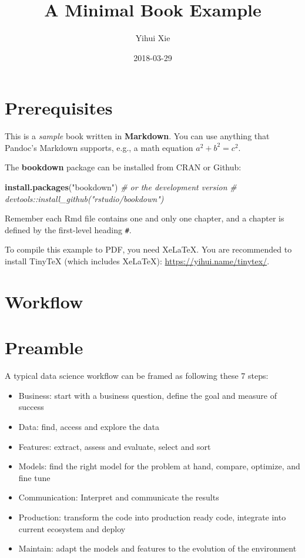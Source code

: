 \documentclass[]{book}
\title{A Minimal Book Example}
\author{Yihui Xie}
\date{2018-03-29}
\newenvironment{Shaded}{\begin{snugshade}}{\end{snugshade}}
\newcommand{\KeywordTok}[1]{\textcolor[rgb]{0.13,0.29,0.53}{\textbf{#1}}}
\newcommand{\StringTok}[1]{\textcolor[rgb]{0.31,0.60,0.02}{#1}}
\newcommand{\CommentTok}[1]{\textcolor[rgb]{0.56,0.35,0.01}{\textit{#1}}}
\newcommand{\NormalTok}[1]{#1}
\theoremstyle{definition}
\theoremstyle{definition}
\theoremstyle{definition}
\theoremstyle{remark}
\begin{document}
\maketitle

{
\setcounter{tocdepth}{1}
\tableofcontents
}
\chapter{Prerequisites}\label{prerequisites}

This is a \emph{sample} book written in \textbf{Markdown}. You can use
anything that Pandoc's Markdown supports, e.g., a math equation
\(a^2 + b^2 = c^2\).

The \textbf{bookdown} package can be installed from CRAN or Github:

\begin{Shaded}
\begin{Highlighting}[]
\KeywordTok{install.packages}\NormalTok{(}\StringTok{"bookdown"}\NormalTok{)}
\CommentTok{# or the development version}
\CommentTok{# devtools::install_github("rstudio/bookdown")}
\end{Highlighting}
\end{Shaded}

Remember each Rmd file contains one and only one chapter, and a chapter
is defined by the first-level heading \texttt{\#}.

To compile this example to PDF, you need XeLaTeX. You are recommended to
install TinyTeX (which includes XeLaTeX):
\url{https://yihui.name/tinytex/}.

\chapter{Workflow}\label{workflow}

\chapter{Preamble}\label{preamble}

A typical data science workflow can be framed as following these 7
steps:

\begin{itemize}
\item
  Business: start with a business question, define the goal and measure
  of success
\item
  Data: find, access and explore the data
\item
  Features: extract, assess and evaluate, select and sort
\item
  Models: find the right model for the problem at hand, compare,
  optimize, and fine tune
\item
  Communication: Interpret and communicate the results
\item
  Production: transform the code into production ready code, integrate
  into current ecosystem and deploy
\item
  Maintain: adapt the models and features to the evolution of the
  environment
\end{itemize}
\end{document}
